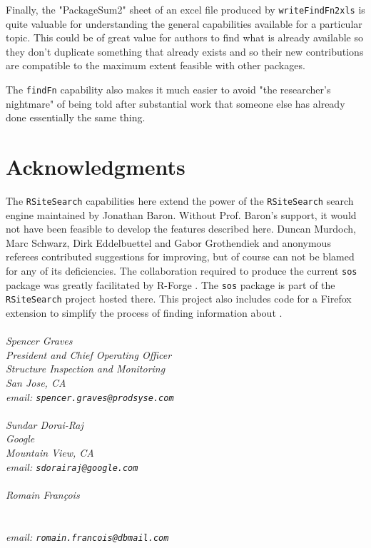 Finally, the "PackageSum2" sheet of an excel file produced by 
{\tt writeFindFn2xls} is quite valuable for understanding the 
general capabilities available for a particular topic.  
This could be of great value for authors to find what is already 
available so they don't duplicate something that already exists 
and so their new contributions are compatible to the maximum extent
feasible with other packages.  

The {\tt findFn} capability also makes it much easier 
to avoid "the researcher's nightmare" of being told after 
substantial work that someone else has already done essentially 
the same thing.  


\section*{Acknowledgments}
The {\tt RSiteSearch} capabilities here extend the power of the
{\tt RSiteSearch} search engine maintained by Jonathan Baron.
Without Prof. Baron's support, it would not have been feasible
to develop the features described here.  Duncan Murdoch, Marc Schwarz,
Dirk Eddelbuettel and Gabor Grothendiek and anonymous
referees contributed suggestions for improving, but of course
can not be blamed for any of its deficiencies.  The collaboration
required to produce the current {\tt sos} package was greatly
facilitated by R-Forge \citep{RFORGE09URL}. The {\tt sos} package
is part of the {\tt RSiteSearch} project hosted there.  This project
also includes code for a Firefox extension to simplify the process of
finding information about \R{}.
\\ \\
\emph{Spencer Graves \\
President and Chief Operating Officer \\
Structure Inspection and Monitoring \\
San Jose, CA \\
email:  {\tt spencer.graves@prodsyse.com} }
\\ \\
\emph{Sundar Dorai-Raj \\
Google \\
Mountain View, CA \\
email:  {\tt sdorairaj@google.com} }
\\ \\
\emph{Romain Fran{\c c}ois \\
\\
\\
email:  {\tt romain.francois@dbmail.com} }
